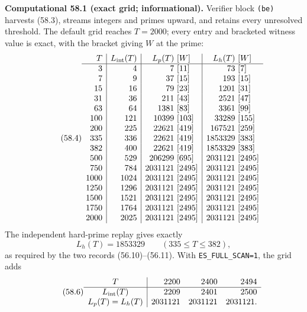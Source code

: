 \documentclass[10pt,reqno]{amsart}
\theoremstyle{definition}
\newcommand{\1}{\mathbf 1}
\begin{document}
\medskip\noindent\textbf{Computational 58.1 (exact grid;
informational).}
Verifier block \texttt{(be)} harvests (58.3), streams integers and primes
upward, and retains every unresolved threshold.  The default grid reaches
$T=2000$; every entry and bracketed witness value is exact, with the bracket
giving $W$ at the prime:
\begingroup
\scriptsize
\begin{equation}\tag{58.4}
\begin{array}{r|r|r@{\ }l|r@{\ }l}
T&L_{\rm int}(T)&L_p(T)&[W]&L_h(T)&[W]\\ \hline
3&4&7&[11]&73&[7]\\
7&9&37&[15]&193&[15]\\
15&16&79&[23]&1201&[31]\\
31&36&211&[43]&2521&[47]\\
63&64&1381&[83]&3361&[99]\\
100&121&10399&[103]&33289&[155]\\
200&225&22621&[419]&167521&[259]\\
335&336&22621&[419]&1853329&[383]\\
382&400&22621&[419]&1853329&[383]\\
500&529&206299&[695]&2031121&[2495]\\
750&784&2031121&[2495]&2031121&[2495]\\
1000&1024&2031121&[2495]&2031121&[2495]\\
1250&1296&2031121&[2495]&2031121&[2495]\\
1500&1521&2031121&[2495]&2031121&[2495]\\
1750&1764&2031121&[2495]&2031121&[2495]\\
2000&2025&2031121&[2495]&2031121&[2495]
\end{array}
\end{equation}
\endgroup
The independent hard-prime replay gives exactly
\begin{equation}\tag{58.5}
                    L_h(T)=1853329\qquad(335\leq T\leq382),
\end{equation}
as required by the two records (56.10)--(56.11).  With
\texttt{ES\_FULL\_SCAN=1}, the grid adds
\begin{equation}\tag{58.6}
\begin{array}{c|rrr}
T&2200&2400&2494\\ \hline
L_{\rm int}(T)&2209&2401&2500\\
L_p(T)=L_h(T)&2031121&2031121&2031121.
\end{array}
\end{equation}
\end{document}
